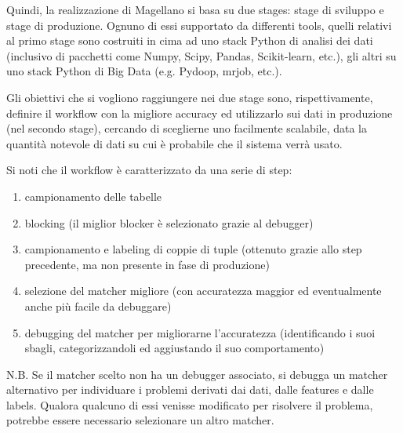 Quindi, la realizzazione di Magellano si basa su due stages: stage di sviluppo e stage di produzione. Ognuno di essi supportato da differenti tools, quelli relativi al primo stage sono costruiti in cima ad uno stack Python di analisi dei dati (inclusivo di pacchetti come Numpy, Scipy, Pandas, Scikit-learn, etc.), gli altri su uno stack Python di Big Data (e.g. Pydoop, mrjob, etc.). 

Gli obiettivi che si vogliono raggiungere nei due stage sono, rispettivamente, definire il workflow con la migliore accuracy ed utilizzarlo sui dati in produzione (nel secondo stage), cercando di sceglierne uno facilmente scalabile, data la quantità notevole di dati su cui è probabile che il sistema verrà usato.

Si noti che il workflow è caratterizzato da una serie di step: 

\begin{enumerate}
    \item campionamento delle tabelle
    \item blocking (il miglior blocker è selezionato grazie al debugger)
    \item campionamento e labeling di coppie di tuple (ottenuto grazie allo step precedente, ma non presente in fase di produzione)
    \item selezione del matcher migliore (con accuratezza maggior ed eventualmente anche più facile da debuggare)
    \item debugging del matcher per migliorarne l'accuratezza (identificando i suoi sbagli, categorizzandoli ed aggiustando il suo comportamento)
\end{enumerate}
N.B. Se il matcher scelto non ha un debugger associato, si debugga un matcher alternativo per individuare i problemi derivati dai dati, dalle features e dalle labels. Qualora qualcuno di essi venisse modificato per risolvere il problema, potrebbe essere necessario selezionare un altro matcher.

